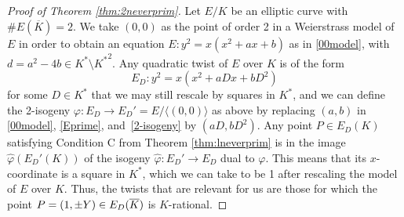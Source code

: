 \documentclass{amsart}
\theoremstyle{plain}
\theoremstyle{definition}
\renewcommand{\tilde}{\widetilde}
\newcommand{\mybar}[1]{
  \mathchoice
  {#1\llap{$\overline{\phantom{\displaystyle\rm#1}}$}}
  {#1\llap{$\overline{\phantom{\textstyle\rm#1}}$}}
  {#1\llap{$\overline{\phantom{\scriptstyle\rm#1}}$}}
  {#1\llap{$\overline{\phantom{\scriptscriptstyle\rm#1}}$}}
}
\renewcommand{\bar}{\mybar}
\begin{document}
\begin{proof}[Proof of Theorem \ref{thm:2neverprim}]
Let $E/K$ be an elliptic curve with $\#E(\overline K)=2$.
We take $(0,0)$ as the point of order 2 in a Weierstrass model of $E$
in order to obtain an equation $E: y^2=x(x^2+ax+b)$ as in \eqref{00model}, 
with $d=a^2-4b\in K^*\setminus {K^*}^2$.     
Any quadratic twist of $E$ over $K$ is of the form 
\[
E_D: y^2=x(x^2+aDx+bD^2)
\]
for some $D\in K^*$ that we may still rescale by squares in $K^*$, 
and we can define the 2-isogeny
$\varphi: E_D \to E_D'=E/\langle (0,0)\rangle$ as above 
by replacing $(a,b)$ in \eqref{00model}, \eqref{Eprime}, 
and~\eqref{2-isogeny} by %
$(aD, bD^2)$.
Any point $P\in E_D(K)$ satisfying Condition C from 
Theorem \ref{thm:lneverprim} is in the image $\widehat\varphi(E_D'(K))$
of the isogeny $\widehat\varphi: E_D'\to E_D$ dual to $\varphi$.
This means that its $x$-coordinate is a square in $K^*$, which we can take to be 1
after rescaling the model of $E$ over $K$.
Thus, the twists that are relevant for us are those for which the point
$P=(1,\pm Y)\in E_D(\bar K)$ is $K$-rational.


\end{proof}
\end{document}
